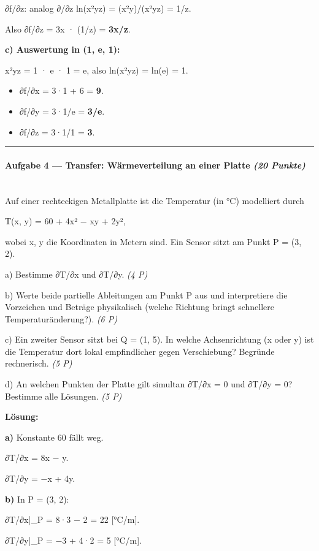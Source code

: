 \documentclass[11pt, a4paper]{article}
\begin{document}
∂f/∂z: analog ∂/∂z ln(x²yz) = (x²y)/(x²yz) = 1/z.

Also ∂f/∂z = 3x · (1/z) = \textbf{3x/z}.


\textbf{c) Auswertung in (1, e, 1):}


x²yz = 1 · e · 1 = e, also ln(x²yz) = ln(e) = 1.


\begin{itemize}
  \item ∂f/∂x = 3·1 + 6 = \textbf{9}.
  \item ∂f/∂y = 3·1/e = \textbf{3/e}.
  \item ∂f/∂z = 3·1/1 = \textbf{3}.
\end{itemize}


\noindent\textcolor{rulegray}{\rule{\linewidth}{0.4pt}}


\paragraph{Aufgabe 4 — Transfer: Wärmeverteilung an einer Platte \textit{(20 Punkte)}}\mbox{}\\[2pt]

Auf einer rechteckigen Metallplatte ist die Temperatur (in °C) modelliert durch


T(x, y) = 60 + 4x² − xy + 2y²,


wobei x, y die Koordinaten in Metern sind. Ein Sensor sitzt am Punkt P = (3, 2).


a) Bestimme ∂T/∂x und ∂T/∂y. \textit{(4 P)}


b) Werte beide partielle Ableitungen am Punkt P aus und interpretiere die Vorzeichen und Beträge physikalisch (welche Richtung bringt schnellere Temperaturänderung?). \textit{(6 P)}


c) Ein zweiter Sensor sitzt bei Q = (1, 5). In welche Achsen­richtung (x oder y) ist die Temperatur dort lokal empfindlicher gegen Verschiebung? Begründe rechnerisch. \textit{(5 P)}


d) An welchen Punkten der Platte gilt simultan ∂T/∂x = 0 und ∂T/∂y = 0? Bestimme alle Lösungen. \textit{(5 P)}


\textbf{Lösung:}


\textbf{a)} Konstante 60 fällt weg.


∂T/∂x = 8x − y.

∂T/∂y = −x + 4y.


\textbf{b)} In P = (3, 2):


∂T/∂x|\_P = 8·3 − 2 = 22 [°C/m].

∂T/∂y|\_P = −3 + 4·2 = 5 [°C/m].
\end{document}
